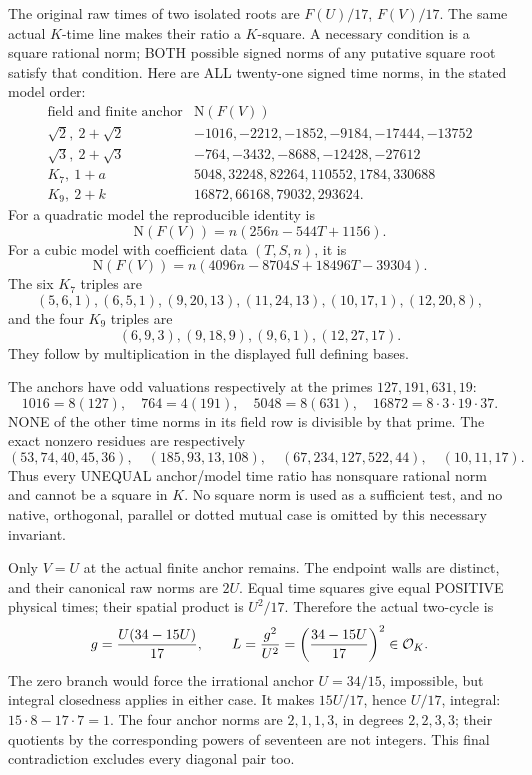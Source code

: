 The original raw times of two isolated roots are \(F(U)/17\),
\(F(V)/17\).
The same actual \(K\)-time line makes their ratio a \(K\)-square.
A necessary condition is a square rational norm; BOTH possible
signed norms of any putative square root satisfy that condition.
Here are ALL twenty-one signed time norms, in the stated model order:
\[
\begin{array}{c|l}
\text{field and finite anchor}&\mathrm N(F(V))\\ \hline
\sqrt2,\ 2+\sqrt2&
 -1016,-2212,-1852,-9184,-17444,-13752\\
\sqrt3,\ 2+\sqrt3&
 -764,-3432,-8688,-12428,-27612\\
K_7,\ 1+a&
 5048,32248,82264,110552,1784,330688\\
K_9,\ 2+k&
 16872,66168,79032,293624 .
\end{array}
\]
For a quadratic model the reproducible identity is
\[
 \mathrm N(F(V))=n(256n-544T+1156).
\]
For a cubic model with coefficient data \((T,S,n)\), it is
\[
 \mathrm N(F(V))
      =n(4096n-8704S+18496T-39304).
\]
The six \(K_7\) triples are
\[
 (5,6,1),(6,5,1),(9,20,13),(11,24,13),(10,17,1),(12,20,8),
\]
and the four \(K_9\) triples are
\[
                     (6,9,3),(9,18,9),(9,6,1),(12,27,17).
\]
They follow by multiplication in the displayed full defining bases.

The anchors have odd valuations respectively at the primes
\(127,191,631,19\):
\[
 1016=8(127),\quad764=4(191),\quad5048=8(631),\quad
 16872=8\cdot3\cdot19\cdot37.
\]
NONE of the other time norms in its field row is divisible by
that prime.  The exact nonzero residues are respectively
\[
 (53,74,40,45,36),\quad(185,93,13,108),\quad
 (67,234,127,522,44),\quad(10,11,17).
\]
Thus every UNEQUAL anchor/model time ratio has nonsquare rational
norm and cannot be a square in \(K\).
No square norm is used as a sufficient test, and no native,
orthogonal, parallel or dotted mutual case is omitted by this
necessary invariant.

Only \(V=U\) at the actual finite anchor remains.
The endpoint walls are distinct, and their canonical raw norms
are \(2U\).
Equal time squares give equal POSITIVE physical times;
their spatial product is \(U^2/17\).
Therefore the actual two-cycle is
\[
 g={U(34-15U)\over17},\qquad
 L={g^2\over U^2}=\left({34-15U\over17}\right)^2
                     \in\mathcal O_K .
\]
The zero branch would force the irrational anchor \(U=34/15\),
impossible, but integral closedness applies in either case.
It makes \(15U/17\), hence \(U/17\), integral:
\(15\cdot8-17\cdot7=1\).
The four anchor norms are \(2,1,1,3\), in degrees \(2,2,3,3\);
their quotients by the corresponding powers of seventeen
are not integers.
This final contradiction excludes every diagonal pair too.

